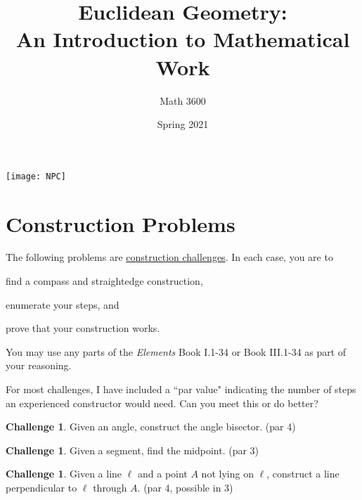 \documentclass{tufte-handout}
\title{Euclidean Geometry:\\An Introduction to Mathematical Work}
\author[]{Math 3600}
\date{Spring 2021}
\theoremstyle{definition}
\newtheorem{challenge}[problem]{Challenge}
\begin{document}
\maketitle

\begin{marginfigure}
    \texttt{[image: NPC]}
\end{marginfigure}

\setcounter{section}{11}
\section{Construction Problems}

The following problems are \underline{construction challenges}. In each case, you are to
\begin{compactenum}
\item find a compass and straightedge construction,
\item enumerate your steps, and
\item prove that your construction works.
\end{compactenum}
You may use any parts of the \emph{Elements} Book I.1-34 or Book III.1-34 as part of your reasoning.



For most challenges, I have included a ``par value" indicating the number of steps an experienced constructor would need.
Can you meet this or do better?


\begin{challenge}\label{chal:angle-bisector}
Given an angle, construct the angle bisector. (par 4)
\end{challenge}

\begin{challenge}\label{chal:midpoint}
Given a segment, find the midpoint. (par 3)
\end{challenge}

\begin{challenge}\label{chal:perp-pt-not-on-line}
Given a line $\ell$ and a point $A$ not lying on $\ell$, construct a line perpendicular to $\ell$ through $A$. (par 4, possible in 3)
\end{challenge}
\end{document}
